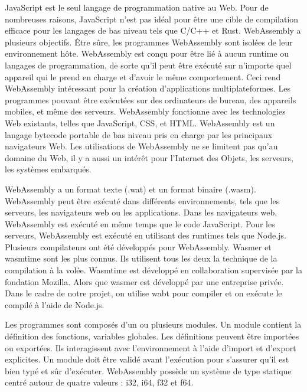 \documentclass{rapportECL}
\begin{document}
JavaScript est le seul langage de programmation native au Web. 
Pour de nombreuses raisons, JavaScript n’est pas idéal pour être une cible de compilation efficace pour les langages de bas niveau tels que C/C++ et Rust. 
WebAssembly a plusieurs objectifs\cite{haas_bringing_2017}. Être sûre, les programmes WebAssembly sont isolées de leur environnement hôte. 
WebAssembly est conçu pour être lié à aucun runtime ou langages de programmation, de sorte qu'il peut être exécuté sur n'importe quel 
appareil qui le prend en charge et d’avoir le même comportement. 
Ceci rend WebAssembly intéressant pour la création d'applications multiplateformes.
Les programmes pouvant être exécutées sur des ordinateurs de bureau, des appareils mobiles, et même des serveurs. 
WebAssembly fonctionne avec les technologies Web existants, telles que JavaScript, CSS, et HTML.
WebAssembly est un langage bytecode portable de bas niveau pris en charge par les principaux navigateurs Web. 
Les utilisations de WebAssembly ne se limitent pas qu'au domaine du Web, il y a aussi un intérêt pour l'Internet des Objets, les serveurs, les systèmes embarqués.
\par WebAssembly a un format texte (.wat) et un format binaire (.wasm). 
WebAssembly peut être exécuté dans différents environnements, tels que les serveurs, les navigateurs web ou les applications. 
Dans les navigateurs web, WebAssembly est exécuté en même temps que le code JavaScript. 
Pour les serveurs, WebAssembly est exécuté en utilisant des runtimes tels que Node.js. 
Plusieurs compilateurs ont été développés pour WebAssembly\cite{noauthor_wabt_2023,noauthor_wasm3_2023,noauthor_wasmer_nodate,noauthor_wasmtime_nodate}. 
Wasmer\cite{noauthor_wasmer_nodate} et wasmtime\cite{noauthor_wasmtime_nodate} sont les plus connus. 
Ils utilisent tous les deux la technique de la compilation à la volée. Wasmtime est développé en collaboration supervisée par la fondation Mozilla. 
Alors que wasmer est développé par une entreprise privée. 
Dans le cadre de notre projet, on utilise wabt\cite{noauthor_wabt_2023} pour compiler et on exécute le compilé à l’aide de Node.js\cite{noauthor_nodejs_nodate}. 
\par Les programmes sont composés d'un ou plusieurs modules. Un module contient la définition des fonctions, variables globales. 
Les définitions peuvent être importées ou exportées.
Ils interagissent avec l’environnement à l’aide d’import et d’export explicites. 
Un module doit être validé avant l’exécution pour s’assurer qu’il est bien typé et sûr d’exécuter. 
WebAssembly possède un système de type statique centré autour de quatre valeurs :  i32, i64, f32 et f64. 
\end{document}
